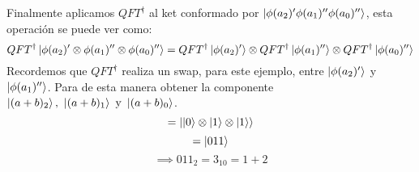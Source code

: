 \documentclass{article}
\begin{document}
Finalmente aplicamos \(QFT^{\dagger}\) al ket conformado por \(\ket{\phi(a_2)'\phi(a_1)''\phi(a_0)''}\), esta operación se puede ver como:
\[QFT^{\dagger}\ket{\phi(a_2)'\otimes\phi(a_1)''\otimes\phi(a_0)''}=QFT^{\dagger}\ket{\phi(a_2)'}\otimes QFT^{\dagger}\ket{\phi(a_1)''}\otimes QFT^{\dagger}\ket{\phi(a_0)''}\]
Recordemos que \(QFT^{\dagger}\) realiza un swap, para este ejemplo, entre $\ket{\phi(a_2)'}$ y $\ket{\phi(a_1)''}$. Para de esta manera obtener
la componente \(\ket{(a+b)_2}\text{, }\ket{(a+b)_1} \text{ y } \ket{(a+b)_0}\).
\[=\ket{\ket{0}\otimes\ket{1}\otimes\ket{1}}\]
\[=\ket{011}\]
\[\implies 011_2 = 3_{10}=1+2\]

\end{document}
